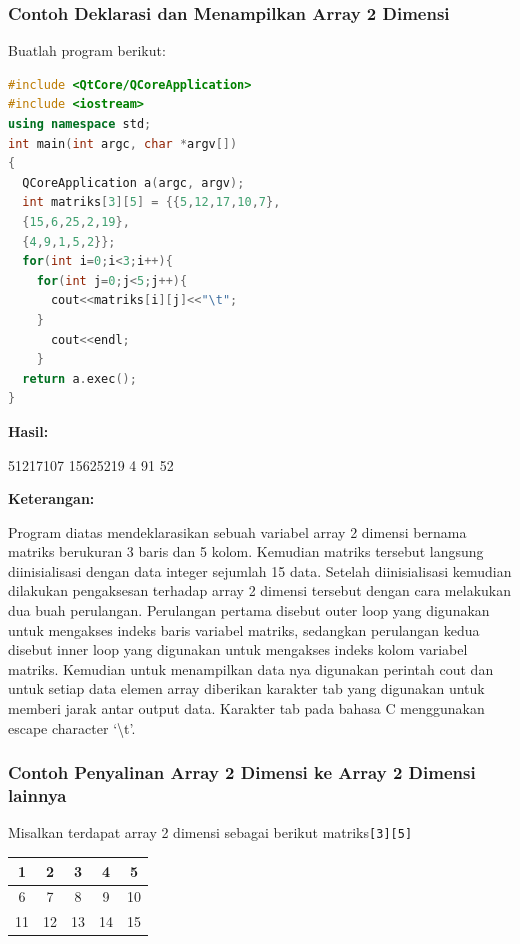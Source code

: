 \subsubsection*{Contoh  Deklarasi dan Menampilkan Array 2 Dimensi}

Buatlah program berikut:

\begin{lstlisting}[language=c++, caption=Deklarasi dan Menampilkan Array 2 Dimensi, label=contoh3-10]
#include <QtCore/QCoreApplication>
#include <iostream>
using namespace std;
int main(int argc, char *argv[])
{
  QCoreApplication a(argc, argv);
  int matriks[3][5] = {{5,12,17,10,7},
  {15,6,25,2,19},
  {4,9,1,5,2}};
  for(int i=0;i<3;i++){
    for(int j=0;j<5;j++){
      cout<<matriks[i][j]<<"\t";
    }
      cout<<endl;
    }
  return a.exec();
}
\end{lstlisting}

\textbf{Hasil:}

\begin{lcverbatim}
51217107
15625219
4 91 52
\end{lcverbatim}


\textbf{Keterangan:}

Program diatas mendeklarasikan sebuah variabel array 2 dimensi bernama
matriks berukuran 3 baris dan 5 kolom. Kemudian matriks tersebut
langsung diinisialisasi dengan data integer sejumlah 15 data. Setelah
diinisialisasi kemudian dilakukan pengaksesan terhadap array 2 dimensi
tersebut dengan cara melakukan dua buah perulangan. Perulangan pertama
disebut outer loop yang digunakan untuk mengakses indeks baris variabel
matriks, sedangkan perulangan kedua disebut inner loop yang digunakan
untuk mengakses indeks kolom variabel matriks. Kemudian untuk
menampilkan data nya digunakan perintah cout dan untuk setiap data
elemen array diberikan karakter tab yang digunakan untuk memberi jarak
antar output data. Karakter tab pada bahasa C menggunakan escape
character `\textbackslash{}t'.

\subsubsection*{Contoh  Penyalinan Array 2 Dimensi ke Array 2 Dimensi lainnya}

Misalkan terdapat array 2 dimensi sebagai berikut
matriks\texttt{{[}3{]}{[}5{]}}

\begin{tabular}{|c|c|c|c|c|}
\hline
1 & 2 & 3 & 4 & 5 \\ \hline
6 & 7 & 8 & 9 & 10 \\ \hline
11 & 12 & 13 & 14 & 15 \\ \hline

\end{tabular}

